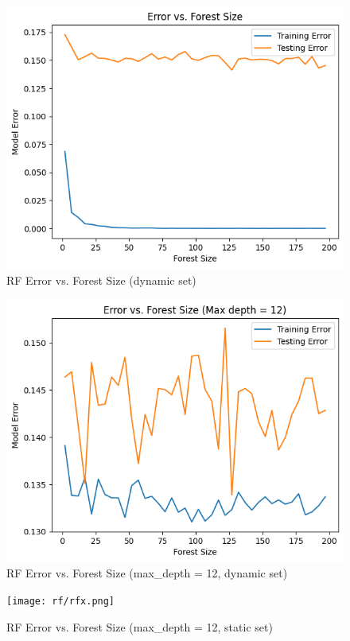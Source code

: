 \documentclass[12pt, letterpaper]{article}
\begin{document}
\begin{figure}[ht]
    \centering
    \includegraphics[width=\textwidth]{rf/rf2.png} %
    \caption{RF Error vs. Forest Size (dynamic set)}
    \label{fig:rf1}
\end{figure}

\begin{figure}[ht]
    \centering
    \includegraphics[width=\textwidth]{rf/rf3.png} %
    \caption{RF Error vs. Forest Size (max\_depth = 12, dynamic set)}
    \label{fig:rf2}
\end{figure}

\begin{figure}[ht]
    \centering
    \texttt{[image: rf/rfx.png]} %
    \caption{RF Error vs. Forest Size (max\_depth = 12, static set)}
    \label{fig:rf3}
\end{figure}
\end{document}
